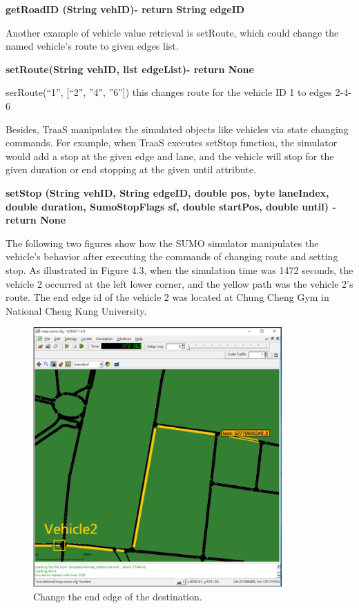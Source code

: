 \documentclass[12pt]{ksthesis}
\begin{document}
\begin{thesis}
{\textbf{getRoadID (String vehID)- return String edgeID}

Another example of vehicle value retrieval is setRoute, which could change the named vehicle’s route to given edges list.

\textbf{setRoute(String vehID, list edgeList)- return None}

serRoute(“1”, [“2”, ”4”, ”6”]) this changes route for the vehicle ID 1 to edges 2-4-6

Besides, TraaS manipulates the simulated objects like vehicles via state changing commands. For example, when TraaS executes setStop function, the simulator would add a stop at the given edge and lane, and the vehicle will stop for the given duration or end stopping at the given until attribute.
 
\textbf{setStop (String vehID, String edgeID, double pos, byte laneIndex, double duration, SumoStopFlags sf, double startPos, double until) - return None}
 
The following two figures show how the SUMO simulator manipulates the vehicle’s behavior after executing the commands of changing route and setting stop.
As illustrated in Figure 4.3, when the simulation time was 1472 seconds, the vehicle 2 occurred at the left lower corner, and the yellow path was the vehicle 2’s route. 
The end edge id of the vehicle 2 was located at Chung Cheng Gym in National Cheng Kung University.

\begin{figure}[t!]
\centering
\includegraphics[width=0.85\textwidth]{./Thesis_figures/F4-3_Change_endEdge.PNG}
\caption{\large Change the end edge of the destination.}
\vspace{0.5cm}
\label{Fig:Change_endEdge}
\end{figure}

}
\end{thesis}
\end{document}
